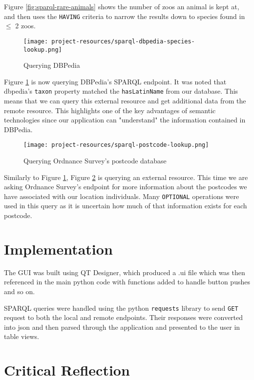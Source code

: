 \documentclass[a4paper]{article}
\begin{document}
Figure \ref{fig:sparql-rare-animals} shows the number of zoos an animal is kept at, and then uses the \texttt{HAVING} criteria to narrow the results down to species found in $\leq$ 2 zoos. 

\begin{figure}[H]
	\centering
	\texttt{[image: project-resources/sparql-dbpedia-species-lookup.png]}
	\caption{Querying DBPedia}
	\label{fig:sparql-dbpedia-species-lookup}
\end{figure}

Figure \ref{fig:sparql-dbpedia-species-lookup} is now querying DBPedia's SPARQL endpoint. It was noted that dbpedia's \texttt{taxon} property matched the \texttt{hasLatinName} from our database. This means that we can query this external resource and get additional data from the remote resource. This highlights one of the key advantages of semantic technologies since our application can "understand" the information contained in DBPedia.

\begin{figure}[H]
	\centering
	\texttt{[image: project-resources/sparql-postcode-lookup.png]}
	\caption{Querying Ordnance Survey's postcode database}
	\label{fig:sparql-postcode-lookup}
\end{figure}

Similarly to Figure \ref{fig:sparql-dbpedia-species-lookup}, Figure \ref{fig:sparql-postcode-lookup} is querying an external resource. This time we are asking Ordnance Survey's endpoint for more information about the postcodes we have associated with our location individuals. Many \texttt{OPTIONAL} operations were used in this query as it is uncertain how much of that information exists for each postcode.


\section{Implementation}



The GUI was built using QT Designer, which produced a .ui file which was then referenced in the main python code with functions added to handle button pushes and so on.

SPARQL queries were handled using the python \texttt{requests} library to send \texttt{GET} request to both the local and remote endpoints. Their responses were converted into json and then parsed through the application and presented to the user in table views.
\section{Critical Reflection}
\end{document}
